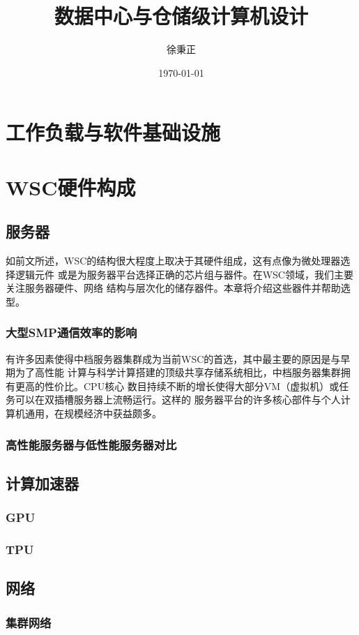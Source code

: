 \documentclass[UTF8]{ctexart}
\title{数据中心与仓储级计算机设计}
\author{徐秉正}
\date{\today}
\begin{document}
\maketitle
\tableofcontents

\section{工作负载与软件基础设施}

\section{WSC硬件构成}
\subsection{服务器}
	如前文所述，WSC的结构很大程度上取决于其硬件组成，这有点像为微处理器选择逻辑元件
	或是为服务器平台选择正确的芯片组与器件。在WSC领域，我们主要关注服务器硬件、网络
	结构与层次化的储存器件。本章将介绍这些器件并帮助选型。
	\subsubsection{大型SMP通信效率的影响}
	有许多因素使得中档服务器集群成为当前WSC的首选，其中最主要的原因是与早期为了高性能
	计算与科学计算搭建的顶级共享存储系统相比，中档服务器集群拥有更高的性价比。CPU核心
	数目持续不断的增长使得大部分VM（虚拟机）或任务可以在双插槽服务器上流畅运行。这样的
	服务器平台的许多核心部件与个人计算机通用，在规模经济中获益颇多。
	\subsubsection{高性能服务器与低性能服务器对比}

\subsection{计算加速器}
	\subsubsection{GPU}
	\subsubsection{TPU}

\subsection{网络}
	\subsubsection{集群网络}
\end{document}
